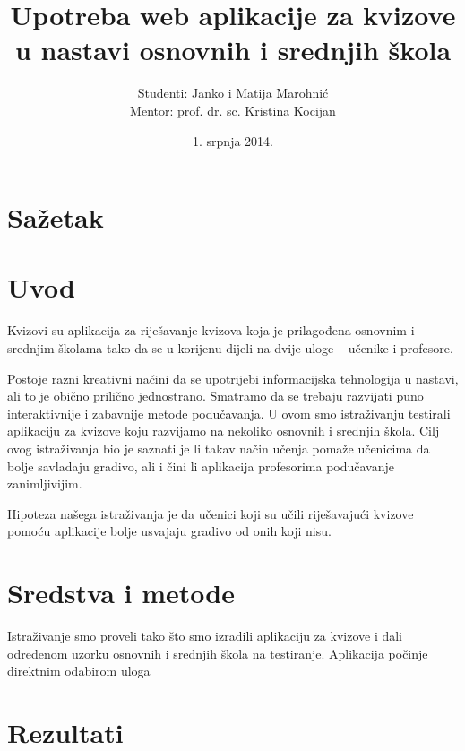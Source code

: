 \documentclass{scrreprt}
\begin{document}
\titlehead{Sveučilište u Zagrebu\\Filozofski fakultet\\Odsijek za informacijske
i komunikacijske znanosti\\Akademska godina 2013/14.}
\title{Upotreba web aplikacije za kvizove u nastavi osnovnih i srednjih škola}
\author{Studenti: Janko i Matija Marohnić\\Mentor: prof. dr. sc. Kristina
Kocijan}
\date{1. srpnja 2014.}

\maketitle
\tableofcontents

\chapter{Sažetak}

\chapter{Uvod}

Kvizovi su aplikacija za riješavanje kvizova koja je prilagođena osnovnim i
srednjim školama tako da se u korijenu dijeli na dvije uloge -- učenike i
profesore.

Postoje razni kreativni načini da se upotrijebi informacijska tehnologija u
nastavi, ali to je obično prilično jednostrano. Smatramo da se trebaju razvijati
puno interaktivnije i zabavnije metode podučavanja. U ovom smo istraživanju
testirali aplikaciju za kvizove koju razvijamo na nekoliko osnovnih i srednjih
škola. Cilj ovog istraživanja bio je saznati je li takav način učenja pomaže
učenicima da bolje savladaju gradivo, ali i čini li aplikacija profesorima
podučavanje zanimljivijim.

Hipoteza našega istraživanja je da učenici koji su učili riješavajući kvizove
pomoću aplikacije bolje usvajaju gradivo od onih koji nisu.

\chapter{Sredstva i metode}

Istraživanje smo proveli tako što smo izradili aplikaciju za kvizove i dali
određenom uzorku osnovnih i srednjih škola na testiranje. Aplikacija počinje
direktnim odabirom uloga \cite{lamport94}

\chapter{Rezultati}
\end{document}
